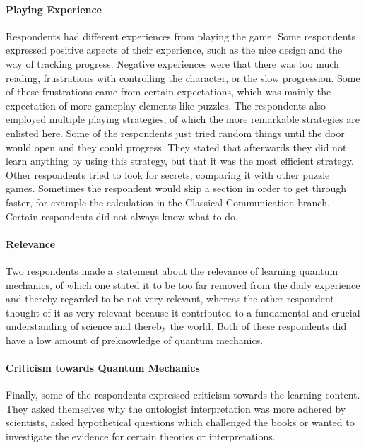 \documentclass[11pt,twoside]{report} %
\begin{document}
\paragraph{Playing Experience}

Respondents had different experiences from playing the game. Some respondents expressed positive aspects of their experience, such as the nice design and the way of tracking progress. Negative experiences were that there was too much reading, frustrations with controlling the character, or the slow progression. Some of these frustrations came from certain expectations, which was mainly the expectation of more gameplay elements like puzzles. The respondents also employed multiple playing strategies, of which the more remarkable strategies are enlisted here. Some of the respondents just tried random things until the door would open and they could progress. They stated that afterwards they did not learn anything by using this strategy, but that it was the most efficient strategy. Other respondents tried to look for secrets, comparing it with other puzzle games. Sometimes the respondent would skip a section in order to get through faster, for example the calculation in the Classical Communication branch. Certain respondents did not always know what to do.

\paragraph{Relevance}

Two respondents made a statement about the relevance of learning quantum mechanics, of which one stated it to be too far removed from the daily experience and thereby regarded to be not very relevant, whereas the other respondent thought of it as very relevant because it contributed to a fundamental and crucial understanding of science and thereby the world. Both of these respondents did have a low amount of preknowledge of quantum mechanics.

\paragraph{Criticism towards Quantum Mechanics}

Finally, some of the respondents expressed criticism towards the learning content. They asked themselves why the ontologist interpretation was more adhered by scientists, asked hypothetical questions which challenged the books or wanted to investigate the evidence for certain theories or interpretations.
\end{document}
